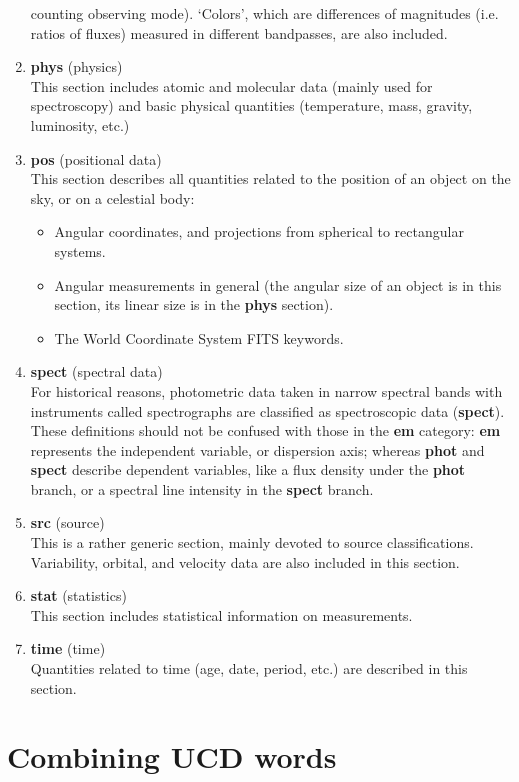 \documentclass[11pt,a4paper]{ivoa}
\begin{document}
\begin{enumerate}
counting observing mode). `Colors', which are differences of magnitudes (i.e. ratios of fluxes) 
measured in different bandpasses, are also included.
\item {\bf phys} (physics)\\ This section includes atomic and molecular data (mainly used for 
spectroscopy) and basic physical quantities (temperature, mass, gravity, luminosity, etc.)
\item {\bf pos} (positional data)\\ This section describes all quantities related to the position of 
an object on the sky, or on a celestial body:
\begin{itemize}
\item Angular coordinates, and projections from spherical to rectangular systems.
\item Angular measurements in general (the angular size of an object is in this section, its linear 
size is in the {\bf phys} section).
\item The World Coordinate System FITS keywords.
\end{itemize}
\item {\bf spect} (spectral data)\\ For historical reasons, photometric data taken in narrow spectral 
bands with instruments called spectrographs are classified as spectroscopic data ({\bf spect}). These 
definitions should not be confused with those in the {\bf em} category: {\bf em} represents the independent 
variable, or dispersion axis; whereas {\bf phot} and {\bf spect} describe dependent variables, like a 
flux density under the {\bf phot} branch, or a spectral line intensity in the {\bf spect} branch.  
\item {\bf src} (source)\\ This is a rather generic section, mainly devoted to source classifications.
Variability, orbital, and velocity data are also included in this section.
\item {\bf stat} (statistics)\\ This section includes statistical information on measurements.
\item {\bf time} (time)\\ Quantities related to time (age, date, period, etc.) are described in this 
section.
\end{enumerate}

\section{Combining UCD words}
\end{document}
